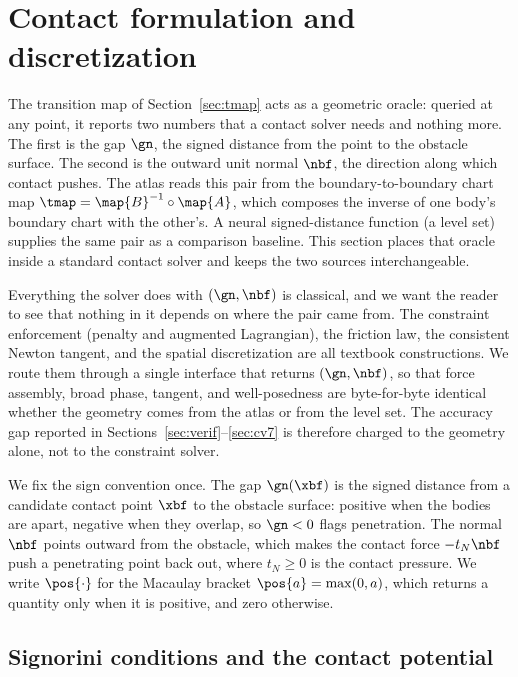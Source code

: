 \section{Contact formulation and discretization}\label{sec:form}

The transition map of Section~\ref{sec:tmap} acts as a geometric oracle: queried at any point, it
reports two numbers that a contact solver needs and nothing more. The first is the gap $\gn$, the
signed distance from the point to the obstacle surface. The second is the outward unit normal $\nbf$,
the direction along which contact pushes. The atlas reads this pair from the boundary-to-boundary
chart map $\tmap=\map{B}^{-1}\circ\map{A}$, which composes the inverse of one body's boundary chart
with the other's. A neural signed-distance function (a level set) supplies the same pair as a
comparison baseline. This section places that oracle inside a standard contact solver and keeps the
two sources interchangeable.

Everything the solver does with $(\gn,\nbf)$ is classical, and we want the reader to see that nothing
in it depends on where the pair came from. The constraint enforcement (penalty and augmented
Lagrangian), the friction law, the consistent Newton tangent, and the spatial discretization are all
textbook constructions. We route them through a single interface that returns $(\gn,\nbf)$, so that
force assembly, broad phase, tangent, and well-posedness are byte-for-byte identical whether the
geometry comes from the atlas or from the level set. The accuracy gap reported in
Sections~\ref{sec:verif}--\ref{sec:cv7} is therefore charged to the geometry alone, not to the
constraint solver.

We fix the sign convention once. The gap $\gn(\xbf)$ is the signed distance from a candidate contact
point $\xbf$ to the obstacle surface: positive when the bodies are apart, negative when they overlap,
so $\gn<0$ flags penetration. The normal $\nbf$ points outward from the obstacle, which makes the
contact force $-t_N\nbf$ push a penetrating point back out, where $t_N\ge0$ is the contact pressure.
We write $\pos{\cdot}$ for the Macaulay bracket $\pos{a}=\max(0,a)$, which returns a quantity only
when it is positive, and zero otherwise.

\subsection{Signorini conditions and the contact potential}\label{sec:form-signorini}

